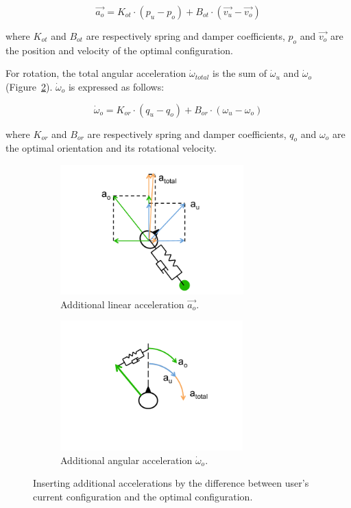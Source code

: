\begin{equation}
\label{eq:option2_t}
\overrightarrow{a_{o}}=K_{ot} \cdot (p_{u}-p_{o})+ B_{ot} \cdot (\overrightarrow{v_{u}}-\overrightarrow{v_{o}})
\end{equation}

where $K_{ot}$ and $B_{ot}$ are respectively spring and damper coefficients, $p_{o}$ and $\overrightarrow{v_{o}}$ are the position and velocity of the optimal configuration.

For rotation, the total angular acceleration $\dot{\omega}_{total}$ is the sum of $\dot{\omega}_{u}$ and $\dot{\omega}_{o}$ (Figure~\ref{fig:5_option2:r}). $\dot{\omega}_{o}$ is expressed as follows:

\begin{equation}
\label{eq:option2_r}
\dot{\omega}_{o}=K_{or} \cdot (q_{u}-q_{o})+ B_{or} \cdot (\omega_{u}-\omega_{o})
\end{equation}

where $K_{or}$ and $B_{or}$ are respectively spring and damper coefficients, $q_{o}$ and $\omega_{o}$ are the optimal orientation and its rotational velocity.

\begin{figure}[htb]
  \begin{subfigure}{.5\textwidth}
    \centering
    \includegraphics[height=5cm]{figures/ch5/option2_t}
    \caption{Additional linear acceleration $\overrightarrow{a_{o}}$.}
    \label{fig:5_option2:t}
  \end{subfigure}
  \begin{subfigure}{.5\textwidth}
    \centering
    \includegraphics[height=5cm]{figures/ch5/option2_r}
    \caption{Additional angular acceleration $\dot{\omega}_{o}$.}
    \label{fig:5_option2:r}
  \end{subfigure}
  \caption{\label{fig:5_option2}Inserting additional accelerations by the difference between user's current configuration and the optimal configuration.}
\end{figure}

